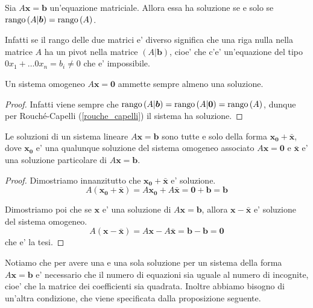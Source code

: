 \begin{theorem} \label{rouche_capelli}
    Sia $A\bm{x} = \bm b$ un'equazione matriciale. Allora essa ha soluzione se e solo se $\operatorname{rango}\left( A|\bm b \right) = \operatorname{rango}\left( A \right)$.
\end{theorem}
\begin{intuition}
    Infatti se il rango delle due matrici e' diverso significa che una riga nulla nella matrice $A$ ha un pivot nella matrice $(A|\bm b)$, cioe' che c'e' un'equazione del tipo $0x_1 + \dots 0x_n = b_i \neq 0$ che e' impossibile.
\end{intuition}

\begin{proposition}
    Un sistema omogeneo $A\bm{x} = \bm 0$ ammette sempre almeno una soluzione.
\end{proposition}
\begin{proof}
    Infatti viene sempre che $\operatorname{rango}\left( A|\bm b \right) = \operatorname{rango}\left( A|\bm 0 \right) = \operatorname{rango}\left( A \right)$, dunque per Rouché-Capelli (\ref{rouche_capelli}) il sistema ha soluzione.
\end{proof}

\begin{proposition}
    Le soluzioni di un sistema lineare $A\bm x = \bm b$ sono tutte e solo della forma $\bm{x_0} + \bm{\bar{x}}$, dove $\bm{x_0}$ e' una qualunque soluzione del sistema omogeneo associato $A\bm x = \bm 0$ e $\bm{\bar{x}}$ e' una soluzione particolare di $A\bm x = \bm b$.
\end{proposition}
\begin{proof}
    Dimostriamo innanzitutto che $\bm{x_0} + \bm{\bar{x}}$ e' soluzione.
    \[A(\bm{x_0} + \bm{\bar{x}}) = A\bm{x_0} + A\bm{\bar{x}} = \bm 0 + \bm b = \bm b\]

    Dimostriamo poi che se $\bm x$ e' una soluzione di $A\bm x = \bm b$, allora $\bm x - \bm{\bar x}$ e' soluzione del sistema omogeneo.
    \[A(\bm{x} - \bm{\bar{x}}) = A\bm{x} - A\bm{\bar{x}} = \bm b - \bm b = \bm 0\]
    che e' la tesi.
\end{proof}

Notiamo che per avere una e una sola soluzione per un sistema della forma $A\bm x = \bm b$ e' necessario che il numero di equazioni sia uguale al numero di incognite, cioe' che la matrice dei coefficienti sia quadrata. Inoltre abbiamo bisogno di un'altra condizione, che viene specificata dalla proposizione seguente.

